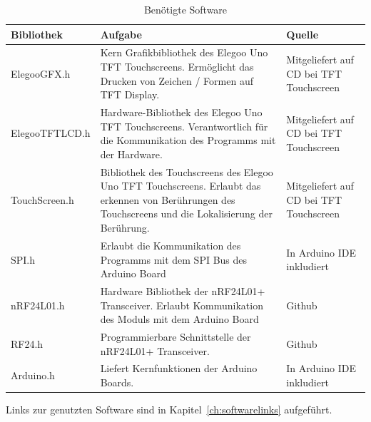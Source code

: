 \documentclass[a4paper, 11pt]{scrartcl}
\begin{document}
\begin{small}
\begin{table}[H]
    \caption{Benötigte Software}\label{tab:software}
    \begin{tabular}{|p{}|p{}|p{}|}
        \hline
        \textbf{Bibliothek} & \textbf{Aufgabe} & \textbf{Quelle}
        \\
        \hline\hline
        Elegoo\text{\_}GFX.h 
        & 
        Kern Grafikbibliothek des Elegoo Uno TFT Touchscreens. Ermöglicht das Drucken von Zeichen / Formen auf TFT Display.
        &
        Mitgeliefert auf CD bei TFT Touchscreen
        \\
        \hline
        Elegoo\text{\_}TFTLCD.h
        &
        Hardware-Bibliothek des Elegoo Uno TFT Touchscreens. Verantwortlich für die Kommunikation des Programms mit der Hardware.
        &
        Mitgeliefert auf CD bei TFT Touchscreen
        \\
        \hline
        TouchScreen.h
        &
        Bibliothek des Touchscreens des Elegoo Uno TFT Touchscreens. Erlaubt das erkennen von Berührungen des Touchscreens und die Lokalisierung der
        Berührung.
        &
        Mitgeliefert auf CD bei TFT Touchscreen
        \\
        \hline
        SPI.h
        &
        Erlaubt die Kommunikation des Programms mit dem SPI Bus des Arduino Board
        &
        In Arduino IDE inkludiert
        \\
        \hline
        nRF24L01.h
        &
        Hardware Bibliothek der nRF24L01+ Transceiver. Erlaubt Kommunikation des Moduls mit dem Arduino Board
        &
        Github %
        \\
        \hline
        RF24.h
        &
        Programmierbare Schnittstelle der nRF24L01+ Transceiver. 
        &
        Github
        \\
        \hline
        Arduino.h
        &
        Liefert Kernfunktionen der Arduino Boards.
        &
        In Arduino IDE inkludiert
        \\
        \hline
    \end{tabular}
\end{table}
Links zur genutzten Software sind in Kapitel~\ref{ch:softwarelinks} aufgeführt.


\end{small}
\end{document}

